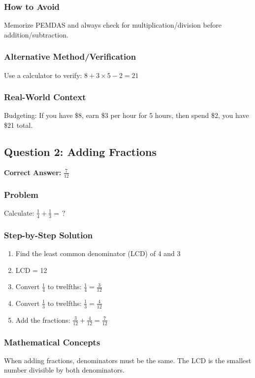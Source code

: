 \documentclass[12pt,a4paper]{article}
\begin{document}
\subsubsection*{How to Avoid}
Memorize PEMDAS and always check for multiplication/division before addition/subtraction.

\subsubsection*{Alternative Method/Verification}
Use a calculator to verify: $8 + 3 \times 5 - 2 = 21$ 

\subsubsection*{Real-World Context}
Budgeting: If you have \$8, earn \$3 per hour for 5 hours, then spend \$2, you have \$21 total.

\vspace{0.5cm}

\subsection*{Question 2: Adding Fractions}

\textbf{Correct Answer:} $\frac{7}{12}$

\subsubsection*{Problem}
Calculate: $\frac{1}{4} + \frac{1}{3} = \,?$

\subsubsection*{Step-by-Step Solution}
\begin{enumerate}
    \item Find the least common denominator (LCD) of 4 and 3
    \item LCD = 12
    \item Convert $\frac{1}{4}$ to twelfths: $\frac{1}{4} = \frac{3}{12}$
    \item Convert $\frac{1}{3}$ to twelfths: $\frac{1}{3} = \frac{4}{12}$
    \item Add the fractions: $\frac{3}{12} + \frac{4}{12} = \frac{7}{12}$
\end{enumerate}

\subsubsection*{Mathematical Concepts}
When adding fractions, denominators must be the same. The LCD is the smallest number divisible by both denominators.
\end{document}
